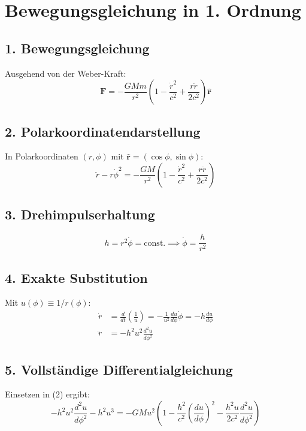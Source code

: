 \section{Bewegungsgleichung in 1. Ordnung}

\subsection*{1. Bewegungsgleichung}
Ausgehend von der Weber-Kraft:
\begin{equation}
\bm{F} = -\frac{GMm}{r^2}\left(1 - \frac{\dot{r}^2}{c^2} + \frac{r\ddot{r}}{2c^2}\right)\bm{\hat{r}}
\end{equation}

\subsection*{2. Polarkoordinatendarstellung}
In Polarkoordinaten $(r,\phi)$ mit $\bm{\hat{r}} = (\cos\phi, \sin\phi)$:
\begin{equation}
\ddot{r} - r\dot{\phi}^2 = -\frac{GM}{r^2}\left(1 - \frac{\dot{r}^2}{c^2} + \frac{r\ddot{r}}{2c^2}\right)
\end{equation}

\subsection*{3. Drehimpulserhaltung}
\begin{equation}
h = r^2\dot{\phi} = \text{const.} \implies \dot{\phi} = \frac{h}{r^2}
\end{equation}

\subsection*{4. Exakte Substitution}
Mit $u(\phi) \equiv 1/r(\phi)$:
\begin{align}
\dot{r} &= \frac{d}{dt}\left(\frac{1}{u}\right) = -\frac{1}{u^2}\frac{du}{d\phi}\dot{\phi} = -h\frac{du}{d\phi} \\
\ddot{r} &= -h^2u^2\frac{d^2u}{d\phi^2}
\end{align}

\subsection*{5. Vollständige Differentialgleichung}
Einsetzen in (2) ergibt:
\begin{equation}
-h^2u^2\frac{d^2u}{d\phi^2} - h^2u^3 = -GMu^2\left(1 - \frac{h^2}{c^2}\left(\frac{du}{d\phi}\right)^2 - \frac{h^2u}{2c^2}\frac{d^2u}{d\phi^2}\right)
\end{equation}

